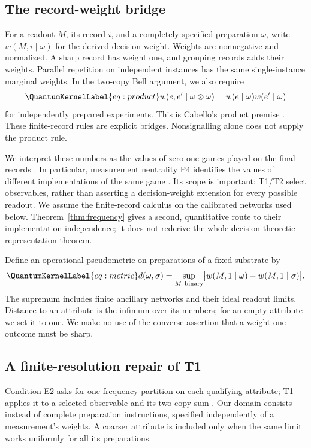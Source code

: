 \documentclass[a4paper,11pt,twocolumn,unpublished]{quantumarticle}
\let\label\QuantumKernelLabel
\begin{document}
\subsection{The record-weight bridge}
For a readout $M$, its record $i$, and a completely specified preparation $\omega$, write $w(M,i\mid\omega)$ for the derived decision weight. Weights are nonnegative and normalized. A sharp record has weight one, and grouping records adds their weights. Parallel repetition on independent instances has the same single-instance marginal weights. In the two-copy Bell argument, we also require
\begin{equation}\label{eq:product}
 w(e,e'\mid\omega\otimes\omega)=w(e\mid\omega)w(e'\mid\omega)
\end{equation}
for independently prepared experiments. This is Cabello's product premise \cite[step I, Eq.~(4)]{cabello}. These finite-record rules are explicit bridges. Nonsignalling alone does not supply the product rule.

We interpret these numbers as the values of zero-one games played on the final records \cite[Secs.~6--7]{ctp}. In particular, measurement neutrality P4 identifies the values of different implementations of the same game \cite[Sec.~7.2, p.~37]{ctp}. Its scope is important: T1/T2 select observables, rather than asserting a decision-weight extension for every possible readout. We assume the finite-record calculus on the calibrated networks used below. Theorem~\ref{thm:frequency} gives a second, quantitative route to their implementation independence; it does not rederive the whole decision-theoretic representation theorem.

Define an operational pseudometric on preparations of a fixed substrate by
\begin{equation}\label{eq:metric}
 d(\omega,\sigma)=\sup_{M\ \mathrm{binary}}\bigl|w(M,1\mid\omega)-w(M,1\mid\sigma)\bigr|.
\end{equation}
The supremum includes finite ancillary networks and their ideal readout limits. Distance to an attribute is the infimum over its members; for an empty attribute we set it to one. We make no use of the converse assertion that a weight-one outcome must be sharp.

\subsection{A finite-resolution repair of T1}
Condition E2 asks for one frequency partition on each qualifying attribute; T1 applies it to a selected observable and its two-copy sum \cite[Sec.~5, E2, p.~28; Sec.~6, T1, p.~30]{ctp}. Our domain consists instead of complete preparation instructions, specified independently of a measurement's weights. A coarser attribute is included only when the same limit works uniformly for all its preparations.
\end{document}
